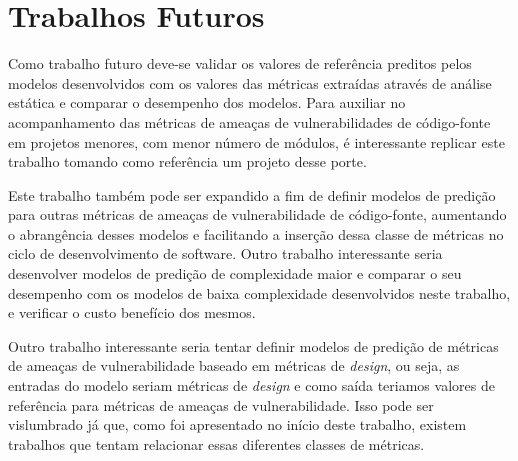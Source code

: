 \section{Trabalhos Futuros}

Como trabalho futuro deve-se validar os valores de referência preditos pelos
modelos desenvolvidos com os valores das métricas extraídas através de análise
estática e comparar o desempenho dos modelos. Para auxiliar no acompanhamento
das métricas de ameaças de vulnerabilidades de código-fonte em projetos menores,
com menor número de módulos, é interessante replicar este trabalho tomando como
referência um projeto desse porte.

Este trabalho também pode ser expandido a fim de definir modelos de predição
para outras métricas de ameaças de vulnerabilidade de código-fonte, aumentando o
abrangência desses modelos e facilitando a inserção dessa classe de métricas no
ciclo de desenvolvimento de software. Outro trabalho interessante seria
desenvolver modelos de predição de complexidade maior e comparar o seu
desempenho com os modelos de baixa complexidade desenvolvidos neste trabalho, e
verificar o custo benefício dos mesmos.

Outro trabalho interessante seria tentar definir modelos de predição de métricas de
ameaças de vulnerabilidade baseado em métricas de \textit{design}, ou seja, as
entradas do modelo seriam métricas de \textit{design} e como saída teriamos
valores de referência para métricas de ameaças de vulnerabilidade. Isso pode ser
vislumbrado já que, como foi apresentado no início deste trabalho, existem
trabalhos que tentam relacionar essas diferentes classes de métricas.

